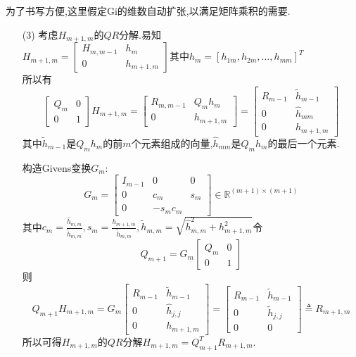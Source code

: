 \documentclass[notheorems,serif]{beamer}
\begin{document}
\begin{frame}
为了书写方便,这里假定Gi的维数自动扩张,以满足矩阵乘积的需要.
\begin{itemize}
	\item[(3)] 考虑$H_{m+1, m}$的$QR$分解.易知\\
	$
	H_{m+1, m}=\left[\begin{array}{cc}{H_{m, m-1}} & {h_{m}} \\ {0} & {h_{m+1, m}}\end{array}\right]
	$其中$h_{m}=\left[h_{1 m}, h_{2 m}, \ldots, h_{m m}\right]^{T}$\\
	所以有
	$$
	\left[\begin{array}{cc}{Q_{m}} & {0} \\ {0} & {1}\end{array}\right] H_{m+1, m}=\left[\begin{array}{cc}{R_{m, m-1}} & {Q_{m} h_{m}} \\ {0} & {h_{m+1, m}}\end{array}\right]=\left[\begin{array}{cc}{R_{m-1}} & {\tilde{h}_{m-1}} \\ {0} & {\hat{h}_{m m}} \\ {0} & {h_{m+1, m}}\end{array}\right]
	$$
	其中$\tilde{h}_{m-1}$是$Q_{m} h_{m}$的前$m$个元素组成的向量,$\hat{h}_{m m}$是$Q_{m} h_{m}$的最后一个元素.\\
\end{itemize}
\end{frame}
\begin{itemize}
	\item[]构造Givens变换$G_{m}$:	
	$$
	G_{m}=\left[\begin{array}{ccc}{I_{m-1}} & {0} & {0} \\ {0} & {c_{m}} & {s_{m}} \\ {0} & {-s_{m} c_{m}}\end{array}\right] \in \mathbb{R}^{(m+1) \times(m+1)}
	$$
	其中$c_{m}=\frac{\hat{h}_{m, m}}{\tilde{h}_{m, m}}, s_{m}=\frac{h_{m+1, m}}{\tilde{h}_{m, m}}, \tilde{h}_{m, m}=\sqrt{\hat{h}_{m, m}^{2}+h_{m+1, m}^{2}}$令
	$$
	Q_{m+1}=G_{m}\left[\begin{array}{cc}{Q_{m}} & {0} \\ {0} & {1}\end{array}\right]
	$$
	则
	$$
	Q_{m+1} H_{m+1, m}=G_{m}\left[\begin{array}{cc}{R_{m-1}} & {\tilde{h}_{m-1}} \\ {0} & {\hat{h}_{j, j}} \\ {0} & {h_{m+1, m}}\end{array}\right]=\left[\begin{array}{cc}{R_{m-1}} & {\tilde{h}_{m-1}} \\ {0} & {\tilde{h}_{j, j}} \\ {0} & {0}\end{array}\right] \triangleq R_{m+1, m}
	$$
	所以可得$H_{m+1, m}$的$QR$分解$H_{m+1, m}=Q_{m+1}^{T} R_{m+1, m}$.
\end{itemize}
\end{document}
